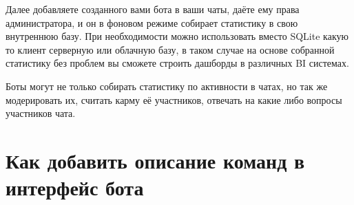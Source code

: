 \documentclass[
]{book}
\newenvironment{Shaded}{\begin{snugshade}}{\end{snugshade}}
\newcommand{\AttributeTok}[1]{\textcolor[rgb]{0.13,0.29,0.53}{#1}}
\newcommand{\CommentTok}[1]{\textcolor[rgb]{0.56,0.35,0.01}{\textit{#1}}}
\newcommand{\ConstantTok}[1]{\textcolor[rgb]{0.56,0.35,0.01}{#1}}
\newcommand{\ControlFlowTok}[1]{\textcolor[rgb]{0.13,0.29,0.53}{\textbf{#1}}}
\newcommand{\FunctionTok}[1]{\textcolor[rgb]{0.13,0.29,0.53}{\textbf{#1}}}
\newcommand{\NormalTok}[1]{#1}
\newcommand{\OtherTok}[1]{\textcolor[rgb]{0.56,0.35,0.01}{#1}}
\newcommand{\SpecialCharTok}[1]{\textcolor[rgb]{0.81,0.36,0.00}{\textbf{#1}}}
\newcommand{\StringTok}[1]{\textcolor[rgb]{0.31,0.60,0.02}{#1}}
\begin{document}
\begin{Shaded}
\end{Shaded}

Далее добавляете созданного вами бота в ваши чаты, даёте ему права администратора, и он в фоновом режиме собирает статистику в свою внутреннюю базу. При необходимости можно использовать вместо SQLite какую то клиент серверную или облачную базу, в таком случае на основе собранной статистику без проблем вы сможете строить дашборды в различных BI системах.

Боты могут не только собирать статистику по активности в чатах, но так же модерировать их, считать карму её участников, отвечать на какие либо вопросы участников чата.

\section{Как добавить описание команд в интерфейс бота}\label{ux43aux430ux43a-ux434ux43eux431ux430ux432ux438ux442ux44c-ux43eux43fux438ux441ux430ux43dux438ux435-ux43aux43eux43cux430ux43dux434-ux432-ux438ux43dux442ux435ux440ux444ux435ux439ux441-ux431ux43eux442ux430}
\end{document}
